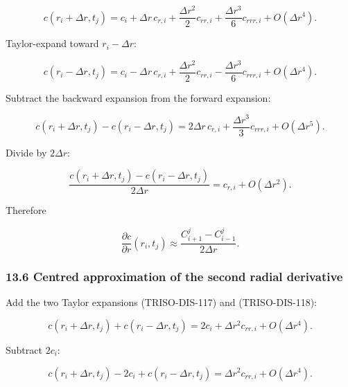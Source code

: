 \documentclass[11pt,a4paper]{article}
\begin{document}
\begin{equation}
c(r_i+\Delta r,t_j)
=
c_i
+
\Delta r\,c_{r,i}
+
\frac{\Delta r^2}{2}c_{rr,i}
+
\frac{\Delta r^3}{6}c_{rrr,i}
+
O(\Delta r^4).
\tag{TRISO-DIS-117}
\label{eq:triso-dis-117}
\end{equation}

Taylor-expand toward $r_i-\Delta r$:

\begin{equation}
c(r_i-\Delta r,t_j)
=
c_i
-
\Delta r\,c_{r,i}
+
\frac{\Delta r^2}{2}c_{rr,i}
-
\frac{\Delta r^3}{6}c_{rrr,i}
+
O(\Delta r^4).
\tag{TRISO-DIS-118}
\label{eq:triso-dis-118}
\end{equation}

Subtract the backward expansion from the forward expansion:

\begin{equation}
c(r_i+\Delta r,t_j)
-
c(r_i-\Delta r,t_j)
=
2\Delta r\,c_{r,i}
+
\frac{\Delta r^3}{3}c_{rrr,i}
+
O(\Delta r^5).
\tag{TRISO-DIS-119}
\label{eq:triso-dis-119}
\end{equation}

Divide by $2\Delta r$:

\begin{equation}
\frac{
c(r_i+\Delta r,t_j)-c(r_i-\Delta r,t_j)
}{
2\Delta r
}
=
c_{r,i}
+
O(\Delta r^2).
\tag{TRISO-DIS-120}
\label{eq:triso-dis-120}
\end{equation}

Therefore

\begin{equation}
\boxed{
\frac{\partial c}{\partial r}(r_i,t_j)
\approx
\frac{
C_{i+1}^j-C_{i-1}^j
}{
2\Delta r
}.
}
\tag{TRISO-DIS-121}
\label{eq:triso-dis-121}
\end{equation}

\subsubsection*{13.6 Centred approximation of the second radial derivative}

Add the two Taylor expansions (TRISO-DIS-117) and (TRISO-DIS-118):

\begin{equation}
c(r_i+\Delta r,t_j)
+
c(r_i-\Delta r,t_j)
=
2c_i
+
\Delta r^2c_{rr,i}
+
O(\Delta r^4).
\tag{TRISO-DIS-122}
\label{eq:triso-dis-122}
\end{equation}

Subtract $2c_i$:

\begin{equation}
c(r_i+\Delta r,t_j)
-
2c_i
+
c(r_i-\Delta r,t_j)
=
\Delta r^2c_{rr,i}
+
O(\Delta r^4).
\tag{TRISO-DIS-123}
\label{eq:triso-dis-123}
\end{equation}
\end{document}
